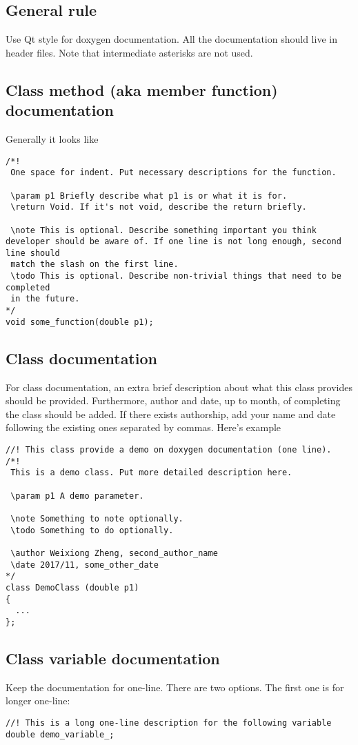 \documentclass{article}
\begin{document}
\subsection{General rule}
Use Qt style for doxygen documentation. All the documentation should live in header files. Note that intermediate asterisks are not used.
\subsection{Class method (aka member function) documentation}
Generally it looks like
\begin{lstlisting}
/*!
 One space for indent. Put necessary descriptions for the function.
 
 \param p1 Briefly describe what p1 is or what it is for.
 \return Void. If it's not void, describe the return briefly.
 
 \note This is optional. Describe something important you think developer should be aware of. If one line is not long enough, second line should
 match the slash on the first line.
 \todo This is optional. Describe non-trivial things that need to be completed 
 in the future.
*/
void some_function(double p1);
\end{lstlisting}

\subsection{Class documentation}
For class documentation, an extra brief description about what this class provides should be provided. Furthermore, author and date, up to month, of completing the class should be added. If there exists authorship, add your name and date following the existing ones separated by commas. Here's example
\begin{lstlisting}
//! This class provide a demo on doxygen documentation (one line).
/*!
 This is a demo class. Put more detailed description here.
 
 \param p1 A demo parameter.
 
 \note Something to note optionally.
 \todo Something to do optionally.
 
 \author Weixiong Zheng, second_author_name
 \date 2017/11, some_other_date
*/
class DemoClass (double p1)
{
  ...
};
\end{lstlisting}

\subsection{Class variable documentation}
Keep the documentation for one-line. There are two options. The first one is for longer one-line:
\begin{lstlisting}
//! This is a long one-line description for the following variable
double demo_variable_;
\end{lstlisting}
\end{document}
